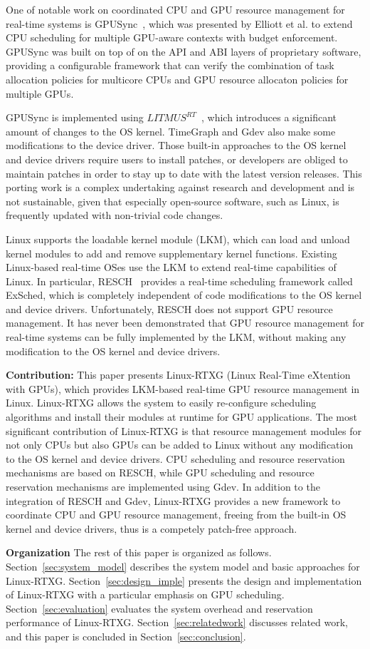 One of notable work on coordinated CPU and GPU resource management for
real-time systems is GPUSync~\cite{elliott:gpusync13,elliott:explor14},
which was presented by Elliott et al. to extend CPU scheduling for
multiple GPU-aware contexts with budget enforcement.
GPUSync was built on top of on the API and ABI layers of proprietary
software, providing a configurable framework that can verify the
combination of task allocation policies for multicore CPUs and GPU
resource allocaton policies for multiple GPUs.

GPUSync is implemented using $LITMUS^{RT}$~\cite{litmus}, which
introduces a significant amount of changes to the OS kernel.
TimeGraph and Gdev also make some modifications to the device driver.
Those built-in approaches to the OS kernel and device drivers require
users to install patches, or developers are obliged to maintain patches
in order to stay up to date with the latest version releases.
This porting work is a complex undertaking against research and
development and is not sustainable, given that especially open-source
software, such as Linux, is frequently updated with non-trivial code
changes.

Linux supports the loadable kernel module (LKM), which can load and
unload kernel modules to add and remove supplementary kernel functions.
Existing Linux-based real-time OSes use the LKM to extend real-time
capabilities of Linux.
In particular, RESCH~\cite{kato2009loadable, asberg2012exsched} provides
a real-time scheduling framework called ExSched, which is completely
independent of code modifications to the OS kernel and device drivers.
Unfortunately, RESCH does not support GPU resource management.
It has never been demonstrated that GPU resource management for
real-time systems can be fully implemented by the LKM, without making
any modification to the OS kernel and device drivers.

\textbf{Contribution:}
This paper presents Linux-RTXG (Linux Real-Time eXtention with GPUs),
which provides LKM-based real-time GPU resource management in Linux.
Linux-RTXG allows the system to easily re-configure scheduling
algorithms and install their modules at runtime for GPU applications.
The most significant contribution of Linux-RTXG is that resource
management modules for not only CPUs but also GPUs can be added to Linux
without any modification to the OS kernel and device drivers.
CPU scheduling and resource reservation mechanisms are based on RESCH,
while GPU scheduling and resource reservation mechanisms are implemented
using Gdev.
In addition to the integration of RESCH and Gdev, Linux-RTXG provides a
new framework to coordinate CPU and GPU resource management, freeing
from the built-in OS kernel and device drivers, thus is a competely
patch-free approach.

\textbf{Organization}
The rest of this paper is organized as follows.
Section~\ref{sec:system_model} describes the system model and basic
approaches for Linux-RTXG.
Section~\ref{sec:design_imple} presents the design and implementation of
Linux-RTXG with a particular emphasis on GPU scheduling.
Section~\ref{sec:evaluation} evaluates the system overhead and
reservation performance of Linux-RTXG.
Section~\ref{sec:relatedwork} discusses related work, and this paper is
concluded in Section~\ref{sec:conclusion}.
